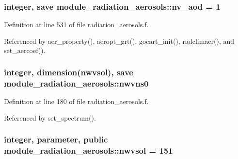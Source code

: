 \subsubsection[{\texorpdfstring{nv\+\_\+aod}{nv_aod}}]{\setlength{\rightskip}{0pt plus 5cm}integer, save module\+\_\+radiation\+\_\+aerosols\+::nv\+\_\+aod = 1\hspace{0.3cm}{\ttfamily [private]}}\hypertarget{namespacemodule__radiation__aerosols_a112670c954eb372efc017253b1096b17}{}\label{namespacemodule__radiation__aerosols_a112670c954eb372efc017253b1096b17}


Definition at line 531 of file radiation\+\_\+aerosols.\+f.



Referenced by aer\+\_\+property(), aeropt\+\_\+grt(), gocart\+\_\+init(), radclimaer(), and set\+\_\+aercoef().

\subsubsection[{\texorpdfstring{nwvns0}{nwvns0}}]{\setlength{\rightskip}{0pt plus 5cm}integer, dimension({\bf nwvsol}), save module\+\_\+radiation\+\_\+aerosols\+::nwvns0\hspace{0.3cm}{\ttfamily [private]}}\hypertarget{namespacemodule__radiation__aerosols_a80194c8356dfb92a43306abbe7097711}{}\label{namespacemodule__radiation__aerosols_a80194c8356dfb92a43306abbe7097711}


Definition at line 180 of file radiation\+\_\+aerosols.\+f.



Referenced by set\+\_\+spectrum().

\subsubsection[{\texorpdfstring{nwvsol}{nwvsol}}]{\setlength{\rightskip}{0pt plus 5cm}integer, parameter, public module\+\_\+radiation\+\_\+aerosols\+::nwvsol = 151}\hypertarget{namespacemodule__radiation__aerosols_a2e0dc6d161d1906050efd67c471673c9}{}\label{namespacemodule__radiation__aerosols_a2e0dc6d161d1906050efd67c471673c9}


